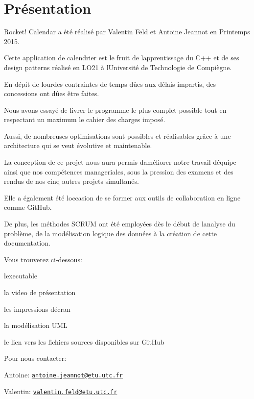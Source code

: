 \hypertarget{index_Présentation}{}\section{Présentation}\label{index_Présentation}
Rocket! Calendar a été réalisé par Valentin Feld et Antoine Jeannot en Printemps 2015.

Cette application de calendrier est le fruit de l\textquotesingle{}apprentissage du C++ et de ses design patterns réalisé en L\+O21 à l\textquotesingle{}Université de Technologie de Compiègne.

En dépit de lourdes contraintes de temps dûes aux délais impartis, des concessions ont dûes être faites.

Nous avons essayé de livrer le programme le plus complet possible tout en respectant un maximum le cahier des charges imposé.

Aussi, de nombreuses optimisations sont possibles et réalisables grâce à une architecture qui se veut évolutive et maintenable.

La conception de ce projet nous aura permis d\textquotesingle{}améliorer notre travail d\textquotesingle{}équipe ainsi que nos compétences manageriales, sous la pression des examens et des rendus de nos cinq autres projets simultanés.

Elle a également été l\textquotesingle{}occasion de se former aux outils de collaboration en ligne comme Git\+Hub.

De plus, les méthodes S\+C\+R\+U\+M ont été employées dès le début de l\textquotesingle{}analyse du problème, de la modélisation logique des données à la création de cette documentation.

Vous trouverez ci-\/dessous\+:
\begin{DoxyItemize}
\item l\textquotesingle{}executable
\item la video de présentation
\item les impressions d\textquotesingle{}écran
\item la modélisation U\+M\+L
\item le lien vers les fichiers sources disponibles sur Git\+Hub
\end{DoxyItemize}

Pour nous contacter\+:
\begin{DoxyItemize}
\item Antoine\+: \href{mailto:antoine.jeannot@etu.utc.fr}{\tt antoine.\+jeannot@etu.\+utc.\+fr}
\item Valentin\+: \href{mailto:valentin.feld@etu.utc.fr}{\tt valentin.\+feld@etu.\+utc.\+fr} 
\end{DoxyItemize}